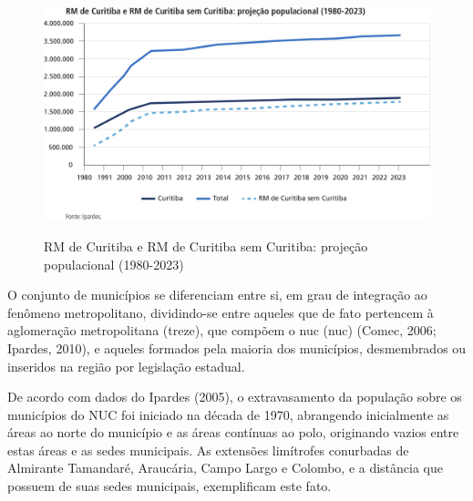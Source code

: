 	\begin{figure}
		\centering
		\caption{RM de Curitiba e RM de Curitiba sem Curitiba: projeção populacional (1980-2023)}
		\includegraphics[width=1.0\linewidth]{img/costa2015a_02}
		\label{fig:costa2015a_02}
	\end{figure}
	
	O conjunto de municípios se diferenciam entre si, em grau de integração ao fenômeno metropolitano, dividindo-se entre aqueles que de fato pertencem à aglomeração metropolitana (treze), que compõem o \glsdesc{nuc} (\gls{nuc}) (Comec, 2006; Ipardes, 2010), e aqueles formados pela maioria dos municípios, desmembrados ou inseridos na região por legislação estadual.
	
    De acordo com dados do Ipardes (2005), o extravasamento da população sobre os municípios do NUC foi iniciado na década de 1970, abrangendo inicialmente as áreas ao norte do município e as áreas contínuas ao polo, originando vazios entre estas áreas e as sedes municipais. As extensões limítrofes conurbadas de Almirante Tamandaré, Araucária, Campo Largo e Colombo, e a distância que possuem de suas sedes municipais, exemplificam este fato.
	
